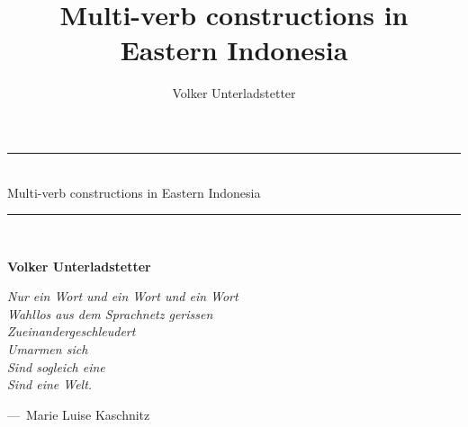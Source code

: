 \documentclass[12pt,a4paper]{book}
\author{Volker Unterladstetter}
\title{Multi-verb constructions in Eastern Indonesia}
\makeatletter
\newenvironment{chapquote}[2][2em]
  {\setlength{\@tempdima}{#1}%
   \def\chapquote@author{#2}%
   \parshape 1 \@tempdima \dimexpr\textwidth-2\@tempdima\relax%
   \itshape}
  {\par\small\hfill---\ \chapquote@author\hspace*{\@tempdima}\par\bigskip}
\makeatother
\begin{document}
\begin{titlepage}
\centering
\vspace*{0.5in}
\begin{Huge}
\rule{\linewidth}{0.5mm}\\
Multi-verb constructions in Eastern Indonesia
\rule{\linewidth}{0.5mm}\\
\end{Huge}
\vspace{2in}

\begin{large}\bfseries
Volker Unterladstetter\par
\end{large}
\end{titlepage}

\setcounter{page}{1} 

\tableofcontents



\printnoidxglossary[type=acronym, style=acronym_index, title={Abbreviations}]


\pagebreak
\thispagestyle{empty}

\vspace*{2in}
\begin{chapquote}[30pt]{Marie Luise Kaschnitz}
{\small\noindent Nur ein Wort und ein Wort und ein Wort\\
Wahllos aus dem Sprachnetz gerissen\\
Zueinandergeschleudert\\
Umarmen sich\\
Sind sogleich eine\\
Sind eine Welt.}
\end{chapquote}

\pagebreak


 \setcounter{page}{1}









 





\nocite{*}
\printbibliography
\end{document}
